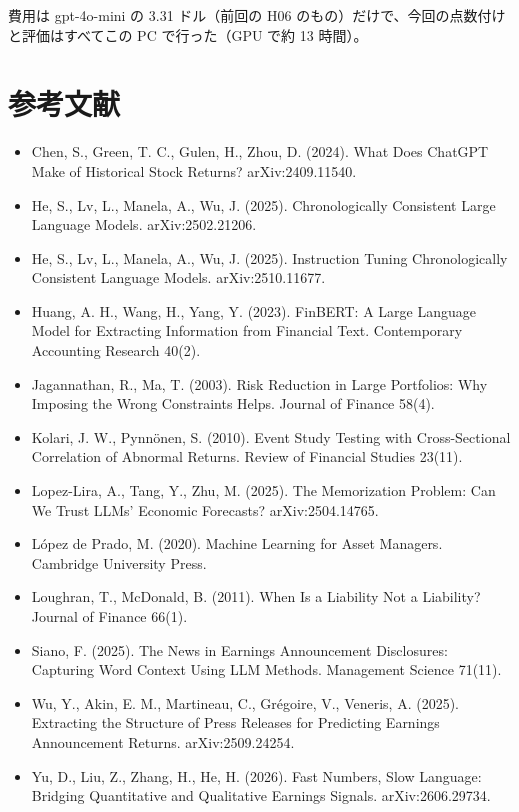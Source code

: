 \documentclass[xelatex,ja=standard,jafont=haranoaji,a4paper,10pt,openany]{bxjsreport}
\begin{document}
費用は gpt-4o-mini の 3.31 ドル（前回の H06 のもの）だけで、今回の点数付けと評価はすべてこの PC で行った（GPU で約 13 時間）。

\chapter*{参考文献}

\begin{itemize}\small
\item Chen, S., Green, T. C., Gulen, H., Zhou, D. (2024). What Does ChatGPT Make of Historical Stock Returns? arXiv:2409.11540.
\item He, S., Lv, L., Manela, A., Wu, J. (2025). Chronologically Consistent Large Language Models. arXiv:2502.21206.
\item He, S., Lv, L., Manela, A., Wu, J. (2025). Instruction Tuning Chronologically Consistent Language Models. arXiv:2510.11677.
\item Huang, A. H., Wang, H., Yang, Y. (2023). FinBERT: A Large Language Model for Extracting Information from Financial Text. Contemporary Accounting Research 40(2).
\item Jagannathan, R., Ma, T. (2003). Risk Reduction in Large Portfolios: Why Imposing the Wrong Constraints Helps. Journal of Finance 58(4).
\item Kolari, J. W., Pynnönen, S. (2010). Event Study Testing with Cross-Sectional Correlation of Abnormal Returns. Review of Financial Studies 23(11).
\item Lopez-Lira, A., Tang, Y., Zhu, M. (2025). The Memorization Problem: Can We Trust LLMs' Economic Forecasts? arXiv:2504.14765.
\item López de Prado, M. (2020). Machine Learning for Asset Managers. Cambridge University Press.
\item Loughran, T., McDonald, B. (2011). When Is a Liability Not a Liability? Journal of Finance 66(1).
\item Siano, F. (2025). The News in Earnings Announcement Disclosures: Capturing Word Context Using LLM Methods. Management Science 71(11).
\item Wu, Y., Akin, E. M., Martineau, C., Grégoire, V., Veneris, A. (2025). Extracting the Structure of Press Releases for Predicting Earnings Announcement Returns. arXiv:2509.24254.
\item Yu, D., Liu, Z., Zhang, H., He, H. (2026). Fast Numbers, Slow Language: Bridging Quantitative and Qualitative Earnings Signals. arXiv:2606.29734.
\end{itemize}
\end{document}
